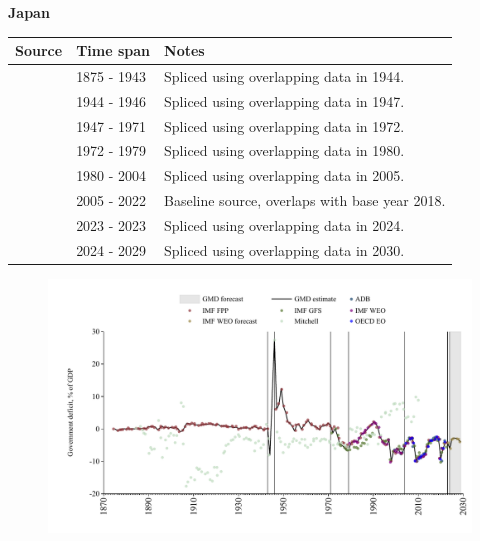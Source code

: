 \documentclass[12pt,a4paper,landscape]{article}
\begin{document}
\begin{adjustbox}{max totalsize={\paperwidth}{\paperheight},center}
\begin{minipage}[t][\textheight][t]{\textwidth}
\vspace*{0.5cm}
{}
\begin{center}
{\Large\bfseries Japan}
\end{center}
\vspace{0.5cm}
\begin{table}[H]
\centering
\small
\begin{tabular}{|l|l|l|}
\hline
\textbf{Source} & \textbf{Time span} & \textbf{Notes} \\
\hline
\rowcolor{white}\cite{IMF_FPP}& 1875 - 1943 &Spliced using overlapping data in 1944.\\
\rowcolor{lightgray}\cite{Mitchell}& 1944 - 1946 &Spliced using overlapping data in 1947.\\
\rowcolor{white}\cite{IMF_FPP}& 1947 - 1971 &Spliced using overlapping data in 1972.\\
\rowcolor{lightgray}\cite{IMF_GFS}& 1972 - 1979 &Spliced using overlapping data in 1980.\\
\rowcolor{white}\cite{IMF_WEO}& 1980 - 2004 &Spliced using overlapping data in 2005.\\
\rowcolor{lightgray}\cite{OECD_EO}& 2005 - 2022 &Baseline source, overlaps with base year 2018.\\
\rowcolor{white}\cite{IMF_FPP}& 2023 - 2023 &Spliced using overlapping data in 2024.\\
\rowcolor{lightgray}\cite{IMF_WEO_forecast}& 2024 - 2029 &Spliced using overlapping data in 2030.\\
\hline
\end{tabular}
\end{table}
\begin{figure}[H]
\centering
\includegraphics[width=\textwidth,height=0.6\textheight,keepaspectratio]{graphs/JPN_govdef_GDP.pdf}
\end{figure}
\end{minipage}
\end{adjustbox}
\end{document}
